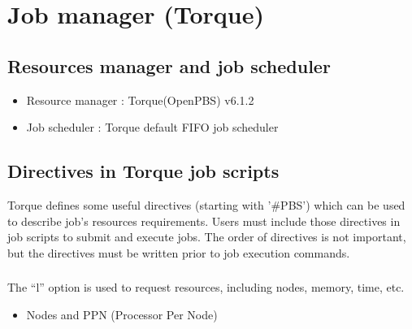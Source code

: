\documentclass[a4paper,10pt,english]{sphinxmanual}
\begin{document}
\section{Job manager (Torque)}
\label{\detokenize{guide:job-manager-torque}}\label{\detokenize{guide:batch-details}}

\subsection{Resources manager and job scheduler}
\label{\detokenize{guide:resources-manager-and-job-scheduler}}\begin{itemize}
\item {} 
\sphinxAtStartPar
Resource manager : Torque(OpenPBS) v6.1.2

\item {} 
\sphinxAtStartPar
Job scheduler : Torque default FIFO job scheduler

\end{itemize}


\subsection{Directives in Torque job scripts}
\label{\detokenize{guide:directives-in-torque-job-scripts}}
\sphinxAtStartPar
Torque defines some useful directives (starting with '\#PBS') which can be used to describe job’s resources requirements. Users must include those directives in job scripts to submit and execute jobs.
The order of directives is not important, but the directives must be written prior to job execution commands.


\subsubsection{}
\label{\detokenize{guide:resource-limits}}
\sphinxAtStartPar
The “\sphinxhyphen{}l” option is used to request resources, including nodes, memory, time, etc.
\begin{itemize}
\item {} 
\sphinxAtStartPar
Nodes and PPN (Processor Per Node)

\end{itemize}
\end{document}
